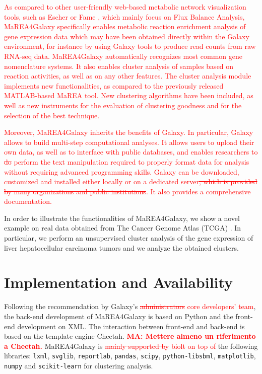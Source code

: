\documentclass[preprint,12pt,authoryear]{elsarticle}
\newcommand{\red}{\textcolor{red}}
\newcommand{\mareagalaxy}{\textsf{MaREA4Galaxy}}
\newcommand{\mareaTool}{\textsf{MaREA}}
\begin{document}
\red{As compared to other user-friendly web-based metabolic network
  visualization tools, such as Escher \citep{king2015escher} or Fame
  \citep{boele2012fame}, which mainly focus on Flux Balance Analysis,
  \mareagalaxy{} specifically enables metabolic reaction enrichment
  analysis of gene expression data which may have been obtained
  directly within the Galaxy environment, for instance by using Galaxy
  tools to produce read counts from raw RNA-seq data. \mareagalaxy{}
  automatically recognizes most common gene nomenclature systems.
  It also enables cluster analysis of samples based on reaction
  activities, as well as on any other features. The cluster analysis
  module implements new functionalities, as compared to the previously
  released MATLAB-based \mareaTool{} tool. New clustering algorithms
  have been included, as well as new instruments for the evaluation of
  clustering goodness and for the selection of the best technique.}

\red{Moreover, \mareagalaxy{} inherits the benefits of Galaxy.  In
  particular, Galaxy allows to build multi-step computational
  analyses. It allows users to upload their own data, as well as to
  interface with public databases, and enables researchers to
  \sout{do} perform the text manipulation required to properly format
  data for analysis without requiring advanced programming skills.
  Galaxy can be downloaded, customized and installed either locally or
  on a dedicated server\sout{, which is provided by many organizations and
  public institutions}. It also provides a comprehensive
  documentation.}

In order to illustrate the functionalities of \mareagalaxy{}, we show a
novel example on real data obtained from The Cancer Genome Atlas
(TCGA) \citep{TCGA}. In particular, we perform an unsupervised cluster
analysis of the gene expression of liver hepatocellular carcinoma
tumors and we analyze the obtained clusters.


\section{Implementation and Availability}

Following the recommendation by Galaxy's \red{\sout{administrators}
  core developers' team}, the back-end
development of \mareagalaxy{} is based on Python and the front-end
development on XML. The interaction between front-end and back-end is
based on the template engine Cheetah. \red{\bfseries MA: Mettere
  almeno un riferimento a Cheetah.}
%
\mareagalaxy{} is \red{\sout{mainly supported by} biolt on top of} the
following libraries: \texttt{lxml}, \texttt{svglib},
\texttt{reportlab}, \texttt{pandas}, \texttt{scipy},
\texttt{python-libsbml}, \texttt{matplotlib}, \texttt{numpy} and
\texttt{scikit-learn} for clustering analysis.
\end{document}

